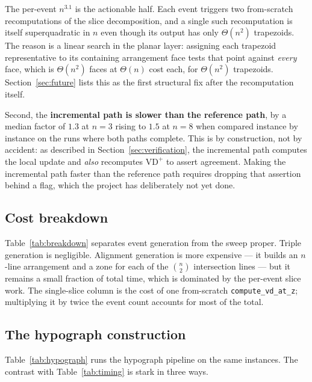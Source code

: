 \documentclass[11pt]{article}
\newcommand{\VD}{\mathrm{VD}}
\begin{document}
The per-event $n^{3.1}$ is the actionable half.  Each event triggers two
from-scratch recomputations of the slice decomposition, and a single such
recomputation is itself superquadratic in $n$ even though its output has only
$\Theta(n^2)$ trapezoids.  The reason is a linear search in the planar layer:
assigning each trapezoid representative to its containing arrangement face
tests that point against \emph{every} face, which is $\Theta(n^2)$ faces at
$\Theta(n)$ cost each, for $\Theta(n^2)$ trapezoids.  Section~\ref{sec:future}
lists this as the first structural fix after the recomputation itself.

Second, the \textbf{incremental path is slower than the reference path}, by a
median factor of $1.3$ at $n = 3$ rising to $1.5$ at $n = 8$ when compared
instance by instance on the runs where both paths complete.  This is by
construction, not by accident: as described in Section~\ref{sec:verification}, the incremental path
computes the local update and \emph{also} recomputes $\VD^+$ to assert
agreement.  Making the incremental path faster than the reference path requires
dropping that assertion behind a flag, which the project has deliberately not
yet done.

\subsection{Cost breakdown}

Table~\ref{tab:breakdown} separates event generation from the sweep proper.
Triple generation is negligible.  Alignment generation is more expensive ---
it builds an $n$-line arrangement and a zone for each of the $\binom{n}{2}$
intersection lines --- but it remains a small fraction of total time, which is
dominated by the per-event slice work.  The single-slice column is the cost of
one from-scratch \texttt{compute\_vd\_at\_z}; multiplying it by twice the event
count accounts for most of the total.



\subsection{The hypograph construction}
\label{sec:bench-hypograph}

Table~\ref{tab:hypograph} runs the hypograph pipeline on the same instances.
The contrast with Table~\ref{tab:timing} is stark in three ways.


\end{document}
